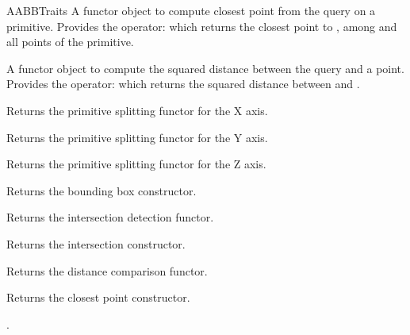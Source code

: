 \begin{ccRefConcept}{AABBTraits}
{A functor object to compute closest point from the query on a primitive. Provides the operator:
 which returns the closest point to , among  and all points of the primitive.}

{A functor object to compute the squared distance between the query and a point. Provides the operator:
 which returns the squared distance between  and .}


\ccOperations

{Returns the primitive splitting functor for the X axis.}

{Returns the primitive splitting functor for the Y axis.}

{Returns the primitive splitting functor for the Z axis.}

{Returns the bounding box constructor.}

{Returns the intersection detection functor.}

{Returns the intersection constructor.}

{Returns the distance comparison functor.}

{Returns the closest point constructor.}

\ccHasModels
{}.

\ccSeeAlso
{}\\

\end{ccRefConcept}

\ccRefPageEnd

